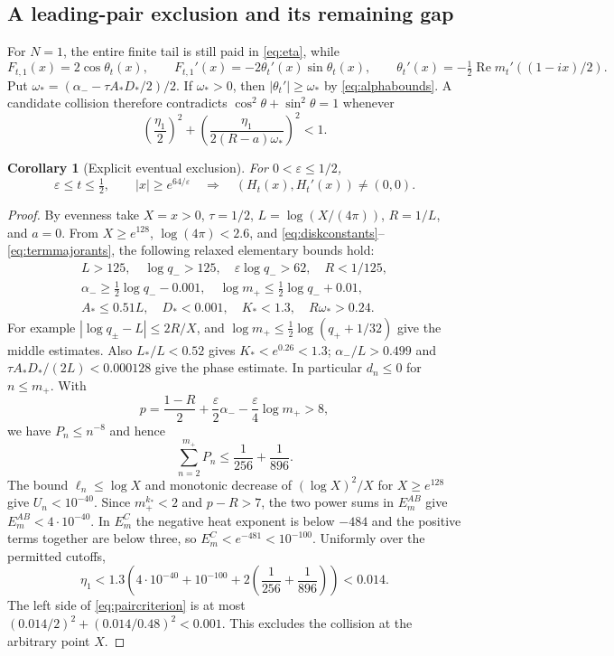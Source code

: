 \documentclass[11pt]{article}
\numberwithin{equation}{section}
\newtheorem{corollary}[theorem]{Corollary}
\theoremstyle{definition}
\theoremstyle{remark}
\DeclareMathOperator{\Rea}{Re}
\begin{document}
\subsection{A leading-pair exclusion and its remaining gap}
For $N=1$, the entire finite tail is still paid in \eqref{eq:eta}, while
\begin{equation}\label{eq:leadingpair}
 F_{t,1}(x)=2\cos\theta_t(x),\qquad
 F_{t,1}'(x)=-2\theta_t'(x)\sin\theta_t(x),\qquad
 \theta_t'(x)=-\tfrac12\Rea m_t'((1-ix)/2).
\end{equation}
Put $\omega_*=(\alpha_- -\tau A_*D_*/2)/2$. If $\omega_*>0$,
then $|\theta_t'|\ge\omega_*$ by \eqref{eq:alphabounds}.
A candidate collision therefore contradicts $\cos^2\theta+\sin^2\theta=1$
whenever
\begin{equation}\label{eq:paircriterion}
 \left(\frac{\eta_1}{2}\right)^2+
 \left(\frac{\eta_1}{2(R-a)\omega_*}\right)^2<1.
\end{equation}

\begin{corollary}[Explicit eventual exclusion]\label{cor:eventual}
For $0<\varepsilon\le1/2$,
\begin{equation}\label{eq:expheight}
 \varepsilon\le t\le\tfrac12,\qquad |x|\ge e^{64/\varepsilon}
 \quad\Longrightarrow\quad(H_t(x),H_t'(x))\ne(0,0).
\end{equation}
\end{corollary}
\begin{proof}
By evenness take $X=x>0$, $\tau=1/2$,
$L=\log(X/(4\pi))$, $R=1/L$, and $a=0$. From $X\ge e^{128}$,
$\log(4\pi)<2.6$, and \eqref{eq:diskconstants}--\eqref{eq:termmajorants},
the following relaxed elementary bounds hold:
\begin{gather*}
 L>125,\quad\log q_->125,\quad\varepsilon\log q_->62,
 \quad R<1/125,\\
 \alpha_-\ge\tfrac12\log q_- -0.001,
 \quad\log m_+\le\tfrac12\log q_-+0.01,\\
 A_*\le0.51L,\quad D_*<0.001,\quad K_*<1.3,
 \quad R\omega_*>0.24.
\end{gather*}
For example $|\log q_\pm-L|\le2R/X$, and
$\log m_+\le\tfrac12\log(q_++1/32)$ give the middle estimates.
Also $L_*/L<0.52$ gives $K_*<e^{0.26}<1.3$;
$\alpha_-/L>0.499$ and $\tau A_*D_*/(2L)<0.000128$ give the
phase estimate. In particular $d_n\le0$ for $n\le m_+$. With
\[
 p=\frac{1-R}{2}+\frac\varepsilon2\alpha_-
                       -\frac\varepsilon4\log m_+>8,
\]
we have $P_n\le n^{-8}$ and hence
\[
 \sum_{n=2}^{m_+}P_n\le\frac1{256}+\frac1{896}.
\]
The bound $\ell_n\le\log X$ and monotonic decrease of
$(\log X)^2/X$ for $X\ge e^{128}$ give $U_n<10^{-40}$.
Since $m_+^{k_*}<2$ and $p-R>7$, the two power sums in
$E_m^{AB}$ give $E_m^{AB}<4\cdot10^{-40}$.
In $E_m^C$ the negative heat exponent is below $-484$ and the
positive terms together are below three, so $E_m^C<e^{-481}<10^{-100}$.
Uniformly over the permitted cutoffs,
\[
 \eta_1<1.3\left(4\cdot10^{-40}+10^{-100}
               +2\left(\frac1{256}+\frac1{896}\right)\right)<0.014.
\]
The left side of \eqref{eq:paircriterion} is at most
$(0.014/2)^2+(0.014/0.48)^2<0.001$. This excludes the collision
at the arbitrary point $X$.
\end{proof}
\end{document}
